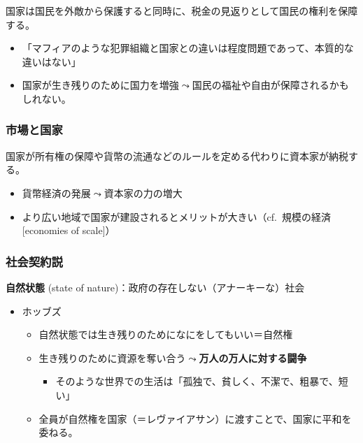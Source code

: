 \documentclass[
  xelatex,
  ja=standard]{bxjsarticle}
\providecommand{\tightlist}{%
  \setlength{\itemsep}{0pt}\setlength{\parskip}{0pt}}\usepackage{longtable,booktabs,array}
\begin{document}
国家は国民を外敵から保護すると同時に、税金の見返りとして国民の権利を保障する。

\begin{itemize}
\tightlist
\item
  「マフィアのような犯罪組織と国家との違いは程度問題であって、本質的な違いはない」\citep{tilly1985}
\item
  国家が生き残りのために国力を増強\(\leadsto\)国民の福祉や自由が保障されるかもしれない。
\end{itemize}

\hypertarget{ux5e02ux5834ux3068ux56fdux5bb6}{%
\subsubsection{市場と国家}\label{ux5e02ux5834ux3068ux56fdux5bb6}}

国家が所有権の保障や貨幣の流通などのルールを定める代わりに資本家が納税する\citep{north1973}。

\begin{itemize}
\tightlist
\item
  貨幣経済の発展\(\leadsto\)資本家の力の増大
\item
  より広い地域で国家が建設されるとメリットが大きい（cf.~規模の経済
  {[}economies of scale{]}）
\end{itemize}

\hypertarget{ux793eux4f1aux5951ux7d04ux8aac}{%
\subsubsection{社会契約説}\label{ux793eux4f1aux5951ux7d04ux8aac}}

\textbf{自然状態} (state of
nature)：政府の存在しない（アナーキーな）社会

\begin{itemize}
\tightlist
\item
  ホッブズ

  \begin{itemize}
  \tightlist
  \item
    自然状態では生き残りのためになにをしてもいい＝自然権
  \item
    生き残りのために資源を奪い合う\(\leadsto\)\textbf{万人の万人に対する闘争}

    \begin{itemize}
    \tightlist
    \item
      そのような世界での生活は「孤独で、貧しく、不潔で、粗暴で、短い」
    \end{itemize}
  \item
    全員が自然権を国家（＝レヴァイアサン）に渡すことで、国家に平和を委ねる。
  \end{itemize}
\end{itemize}
\end{document}
